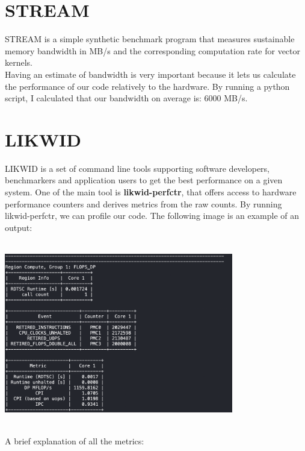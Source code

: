 \documentclass[11pt,a4paper,oneside,titlepage,openright]{book}
\begin{document}
\section{STREAM} 
STREAM is a simple synthetic benchmark program that measures sustainable memory bandwidth in MB/s and the corresponding computation rate for  vector kernels. \\
 Having an estimate of bandwidth is very important because it lets us calculate the performance of our code relatively to the hardware. 
By running a python script, I calculated that our bandwidth on average is: 6000 MB/s.


\section{LIKWID}
LIKWID is a set of command line tools supporting software developers, benchmarkers and application users to get the best performance on a given system.
One of the main tool is \textbf{likwid-perfctr}, that offers access to hardware performance counters and derives metrics from the raw counts. 
By running likwid-perfctr, we can profile our code. The following image is an example of an output: 

\begin{center}
\includegraphics[width=10cm, height=8cm]{scree_lik_perf}
\end{center}

A brief explanation of all the metrics: 
\end{document}
